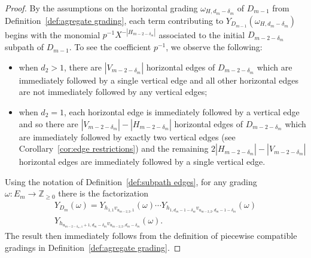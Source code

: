\documentclass[10pt]{amsart}
\theoremstyle{definition}
\newcommand{\ZZ}{\mathbb{Z}}
\begin{document}
\begin{proof}
 By the assumptions on the horizontal grading $\omega_{H,d_m-\delta_m}$ of $D_{m-1}$ from Definition~\ref{def:agregate grading}, each term contributing to $Y_{D_{m-1}}(\omega_{H,d_m-\delta_m})$ begins with the monomial $p^{-1}X^{-|H_{m-2-\delta_m}|}$ associated to the initial $D_{m-2-\delta_m}$ subpath of $D_{m-1}$. 
 To see the coefficient $p^{-1}$, we observe the following:
 \begin{itemize}
 \item when $d_2>1$, there are $|V_{m-2-\delta_m}|$ horizontal edges of $D_{m-2-\delta_m}$ which are immediately followed by a single vertical edge and all other horizontal edges are not immediately followed by any vertical edges;
 \item when $d_2=1$, each horizontal edge is immediately followed by a vertical edge and so there are $|V_{m-2-\delta_m}|-|H_{m-2-\delta_m}|$ horizontal edges of $D_{m-2-\delta_m}$ which are immediately followed by exactly two vertical edges (see Corollary~\ref{cor:edge restrictions}) and the remaining $2|H_{m-2-\delta_m}|-|V_{m-2-\delta_m}|$ horizontal edges are immediately followed by a single vertical edge.
 \end{itemize}

 Using the notation of Definition~\ref{def:subpath edges}, for any grading $\omega:E_m\to\ZZ_{\ge0}$ there is the factorization
 \begin{multline*}
 Y_{D_m}(\omega)=Y_{h_{1,1}v_{u_{m-2,2},1}}(\omega)\cdots Y_{h_{1,d_m-1-\delta_m}v_{u_{m-2,2},d_m-1-\delta_m}}(\omega)\\
 Y_{h_{u_{m-2-\delta_m,1}+1,d_m-\delta_m}v_{u_{m-2,2},d_m-\delta_m}}(\omega).
 \end{multline*}
 The result then immediately follows from the definition of piecewise compatible gradings in Definition~\ref{def:agregate grading}.
\end{proof}
\end{document}
